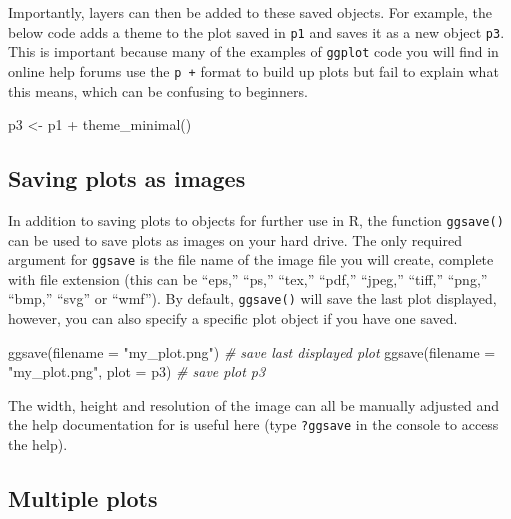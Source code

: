 \documentclass[
  english,
  doc,floatsintext]{apa6}
\newenvironment{Shaded}{\begin{snugshade}}{\end{snugshade}}
\newcommand{\AttributeTok}[1]{\textcolor[rgb]{0.77,0.63,0.00}{#1}}
\newcommand{\CommentTok}[1]{\textcolor[rgb]{0.56,0.35,0.01}{\textit{#1}}}
\newcommand{\FunctionTok}[1]{\textcolor[rgb]{0.00,0.00,0.00}{#1}}
\newcommand{\NormalTok}[1]{#1}
\newcommand{\OtherTok}[1]{\textcolor[rgb]{0.56,0.35,0.01}{#1}}
\newcommand{\SpecialCharTok}[1]{\textcolor[rgb]{0.00,0.00,0.00}{#1}}
\newcommand{\StringTok}[1]{\textcolor[rgb]{0.31,0.60,0.02}{#1}}
\begin{document}
Importantly, layers can then be added to these saved objects. For example, the below code adds a theme to the plot saved in \texttt{p1} and saves it as a new object \texttt{p3}. This is important because many of the examples of \texttt{ggplot} code you will find in online help forums use the \texttt{p\ +} format to build up plots but fail to explain what this means, which can be confusing to beginners.

\begin{Shaded}
\begin{Highlighting}[]
\NormalTok{p3 }\OtherTok{\textless{}{-}}\NormalTok{ p1 }\SpecialCharTok{+} \FunctionTok{theme\_minimal}\NormalTok{()}
\end{Highlighting}
\end{Shaded}

\hypertarget{saving-plots-as-images}{%
\subsection{Saving plots as images}\label{saving-plots-as-images}}

In addition to saving plots to objects for further use in R, the function \texttt{ggsave()} can be used to save plots as images on your hard drive. The only required argument for \texttt{ggsave} is the file name of the image file you will create, complete with file extension (this can be ``eps,'' ``ps,'' ``tex,'' ``pdf,'' ``jpeg,'' ``tiff,'' ``png,'' ``bmp,'' ``svg'' or ``wmf''). By default, \texttt{ggsave()} will save the last plot displayed, however, you can also specify a specific plot object if you have one saved.

\begin{Shaded}
\begin{Highlighting}[]
\FunctionTok{ggsave}\NormalTok{(}\AttributeTok{filename =} \StringTok{"my\_plot.png"}\NormalTok{) }\CommentTok{\# save last displayed plot}
\FunctionTok{ggsave}\NormalTok{(}\AttributeTok{filename =} \StringTok{"my\_plot.png"}\NormalTok{, }\AttributeTok{plot =}\NormalTok{ p3) }\CommentTok{\# save plot p3}
\end{Highlighting}
\end{Shaded}

The width, height and resolution of the image can all be manually adjusted and the help documentation for is useful here (type \texttt{?ggsave} in the console to access the help).

\hypertarget{multiple-plots}{%
\subsection{Multiple plots}\label{multiple-plots}}
\end{document}
